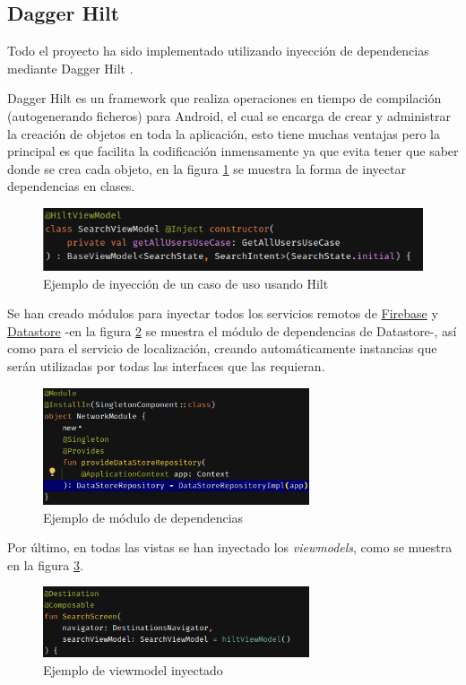 \subsection{Dagger Hilt}
Todo el proyecto ha sido implementado utilizando inyección de dependencias mediante Dagger Hilt \hyperlink{cap:biblio}{}. 

Dagger Hilt es un framework que realiza operaciones en tiempo de compilación (autogenerando ficheros) para Android, el cual se encarga de crear y administrar la creación de objetos en toda la aplicación, esto tiene muchas ventajas pero la principal es que facilita la codificación inmensamente ya que evita tener que saber donde se crea cada objeto, en la figura \ref{fig:ejemplo_hilt1} se muestra la forma de inyectar dependencias en clases.
\begin{figure}[h]
	\centering
	\includegraphics[width = 1\textwidth]{Imagenes/Fuentes/ejemplo_hilt1.png}
	\caption{Ejemplo de inyección de un caso de uso usando Hilt}
	\label{fig:ejemplo_hilt1}
\end{figure}

Se han creado módulos para inyectar todos los servicios remotos de \hyperlink{subsec:firebase}{Firebase} y \hyperlink{subsec:datastore}{Datastore} -en la figura \ref{fig:ejemplo_hilt2} se muestra el módulo de dependencias de Datastore-, así como para el servicio de localización, creando automáticamente instancias que serán utilizadas por todas las interfaces que las requieran.
\newpage
\begin{figure}[h]
	\centering
	\includegraphics[width = 0.7\textwidth]{Imagenes/Fuentes/ejemplo_hilt2.png}
	\caption{Ejemplo de módulo de dependencias}
	\label{fig:ejemplo_hilt2}
\end{figure}

Por último, en todas las vistas se han inyectado los \textit{viewmodels}, como se muestra en la figura \ref{fig:ejemplo_hilt3}.
\begin{figure}[h]
	\centering
	\includegraphics[width = 0.7\textwidth]{Imagenes/Fuentes/ejemplo_hilt3.png}
	\caption{Ejemplo de viewmodel inyectado}
	\label{fig:ejemplo_hilt3}
\end{figure}

